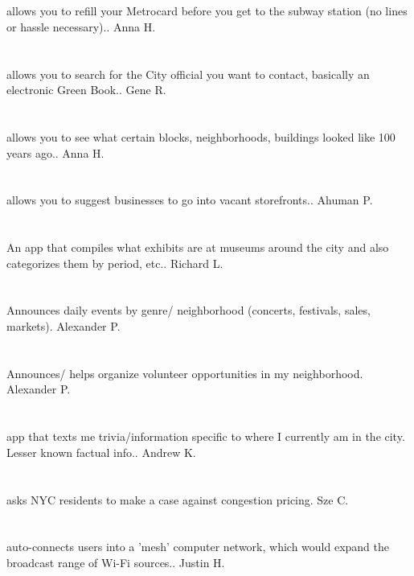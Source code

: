 \section{}allows you to refill your Metrocard before you get to the subway station (no lines or hassle necessary).. Anna H.
\section{}allows you to search for the City official you want to contact,  basically an electronic Green Book.. Gene R.
\section{}allows you to see what certain blocks,  neighborhoods,  buildings looked like 100 years ago.. Anna H.
\section{}allows you to suggest businesses to go into vacant storefronts.. Ahuman P.
\section{}An app that compiles what exhibits are at museums around the city and also categorizes them by period,  etc.. Richard L.
\section{}Announces daily events by genre/ neighborhood (concerts,  festivals,  sales,  markets). Alexander P.
\section{}Announces/ helps organize volunteer opportunities in my neighborhood. Alexander P.
\section{}app that texts me trivia/information specific to where I currently am in the city.  Lesser known factual info.. Andrew K.
\section{}asks NYC residents to make a case against congestion pricing. Sze C.
\section{}auto-connects users into a 'mesh' computer network,  which would expand the broadcast range of Wi-Fi sources.. Justin H.
